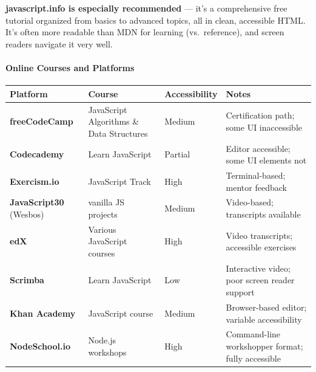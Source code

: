 \documentclass[
  justified,
  openright,
]{tufte-book}
\let\subsection\paragraph
\let\paragraph\paragraph
\let\subsection\paragraph
\let\paragraph\paragraph
\begin{document}
\textbf{javascript.info is especially recommended} --- it's a
comprehensive free tutorial organized from basics to advanced topics,
all in clean, accessible HTML. It's often more readable than MDN for
learning (vs.~reference), and screen readers navigate it very well.

\subsection{Online Courses and
Platforms}\label{online-courses-and-platforms-1}

\begin{fullwidth}{\def\LTcaptype{none} %
\begin{longtable}[]{@{}
  >{\raggedright\arraybackslash}p{}
  >{\raggedright\arraybackslash}p{}
  >{\raggedright\arraybackslash}p{}
  >{\raggedright\arraybackslash}p{}@{}}
\toprule\noalign{}
\begin{minipage}[b]{\linewidth}\raggedright
Platform
\end{minipage} & \begin{minipage}[b]{\linewidth}\raggedright
Course
\end{minipage} & \begin{minipage}[b]{\linewidth}\raggedright
Accessibility
\end{minipage} & \begin{minipage}[b]{\linewidth}\raggedright
Notes
\end{minipage} \\
\midrule\noalign{}
\endhead
\bottomrule\noalign{}
\endlastfoot
\textbf{freeCodeCamp} & JavaScript Algorithms \& Data Structures &
Medium & Certification path; some UI inaccessible \\
\textbf{Codecademy} & Learn JavaScript & Partial & Editor accessible;
some UI elements not \\
\textbf{Exercism.io} & JavaScript Track & High & Terminal-based; mentor
feedback \\
\textbf{JavaScript30} (Wesbos) & 30 vanilla JS projects & Medium &
Video-based; transcripts available \\
\textbf{edX} & Various JavaScript courses & High & Video transcripts;
accessible exercises \\
\textbf{Scrimba} & Learn JavaScript & Low & Interactive video; poor
screen reader support \\
\textbf{Khan Academy} & JavaScript course & Medium & Browser-based
editor; variable accessibility \\
\textbf{NodeSchool.io} & Node.js workshops & High & Command-line
workshopper format; fully accessible \\
\end{longtable}
}
\end{fullwidth}
\end{document}
